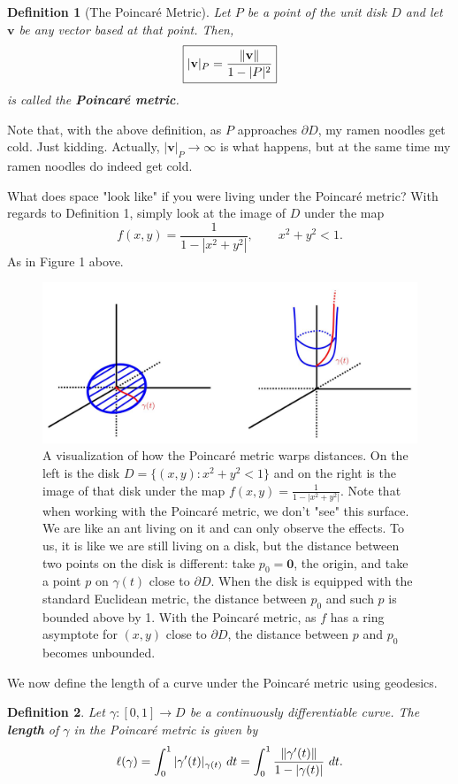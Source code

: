 \documentclass[10pt]{article}
\theoremstyle{plain}
\newtheorem{definition}{Definition}
\begin{document}
	\begin{definition}[The Poincaré Metric]
		Let $P$ be a point of the unit disk $D$ and let $\mathbf{v}$ be any vector based at that point. Then, $$\boxed{|\mathbf{v}|_P = \frac{\norm{\mathbf{v}}}{1 - |P|^2}}$$ is called the \textbf{\textit{Poincaré metric}}. 
	\end{definition}

	\noindent Note that, with the above definition, as $P$ approaches $\partial D$, my ramen noodles get cold. Just kidding. Actually, $|\mathbf{v}|_P \to \infty$ is what happens, but at the same time my ramen noodles do indeed get cold.
	
	
	What does space "look like" if you were living under the Poincaré metric? With regards to Definition 1, simply look at the image of $D$ under the map $$f(x, y) = \frac{1}{1 - |x^2 + y^2|}, \qquad x^2 + y^2 < 1.$$ As in Figure 1 above. 
	
		\begin{figure}
			\centering
			\includegraphics[scale = 0.25]{images/pcmetric.JPG}
			\caption{\small{A visualization of how the Poincaré metric warps distances. On the left is the disk $D = \{(x, y) : x^2 + y^2 < 1\}$ and on the right is the image of that disk under the map $f(x, y) = \frac{1}{1 - |x^2 + y^2|}.$ Note that when working with the Poincaré metric, we don't "see" this surface. We are like an ant living on it and can only observe the effects. To us, it is like we are still living on a disk, but the distance between two points on the disk is different: take $p_0 = \mathbf{0}$, the origin, and take a point $p$ on $\gamma(t)$ close to $\partial D$. When the disk is equipped with the standard Euclidean metric, the distance between $p_0$ and such $p$ is bounded above by 1. With the Poincaré metric, as $f$ has a ring asymptote for $(x, y)$ close to $\partial D$, the distance between $p$ and $p_0$ becomes unbounded.}} 
		\end{figure}
	We now define the length of a curve under the Poincaré metric using geodesics. 
		\begin{definition}
			Let $\gamma: [0, 1] \to D$ be a continuously differentiable curve. The \textbf{\textit{length}} of $\gamma$ in the Poincaré metric is given by $$\ell(\gamma) = \int_0^1 |\gamma'(t)|_{\gamma(t)} \ dt = \int_0^1 \frac{\norm{\gamma'(t)}}{1 - |\gamma(t)|} \ dt.$$ 
		\end{definition} 
	
\end{document}
